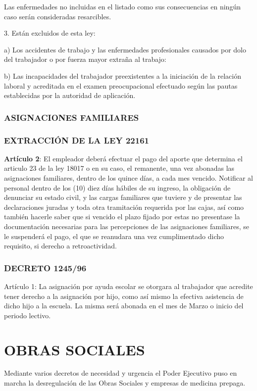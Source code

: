 Las enfermedades no incluidas en el listado como sus consecuencias en ningún caso serán consideradas resarcibles.

3. Están excluidos de esta ley:

a) Los accidentes de trabajo y las enfermedades profesionales causados por dolo del trabajador o por fuerza mayor extraña al trabajo:

b) Las incapacidades del trabajador preexistentes a la iniciación de la relación laboral y acreditada en el examen preocupacional efectuado según las pautas establecidas por la autoridad de aplicación.

\subsubsection*{ASIGNACIONES FAMILIARES}
\subsubsection*{EXTRACCIÓN DE LA LEY 22161}
\textbf{Artículo 2}: El empleador deberá efectuar el pago del aporte que determina el articulo 23 de la ley 18017 o en su caso, el remanente, una vez abonadas las asignaciones familiares, dentro de los quince días, a cada mes vencido. Notificar al personal dentro de los (10) diez días hábiles de su ingreso, la obligación de denunciar su estado civil, y las cargas familiares que tuviere y de presentar las declaraciones juradas y toda otra tramitación requerida por las cajas, así como también hacerle saber que si vencido el plazo fijado por estas no presentase la documentación necesarias para las percepciones de las asignaciones familiares, se le suspenderá el pago, el que se reanudara una vez cumplimentado dicho requisito, si derecho a retroactividad.

\subsubsection*{DECRETO 1245/96}


Artículo 1: La asignación por ayuda escolar se otorgara al trabajador que acredite tener derecho a la asignación por hijo, como así mismo la efectiva asistencia de dicho hijo a la escuela. La misma será abonada en el mes de Marzo o inicio del periodo lectivo.

\section*{OBRAS SOCIALES}
Mediante varios decretos de necesidad y urgencia el Poder Ejecutivo puso en marcha la desregulación de las Obras Sociales y empresas de medicina prepaga.

